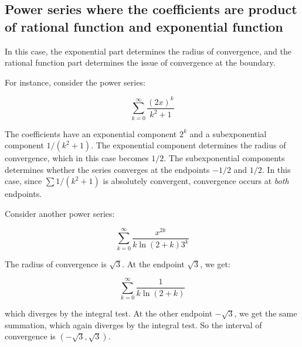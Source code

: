 \documentclass{amsart}
\begin{document}
\subsection{Power series where the coefficients are product of rational function and exponential function}

In this case, the exponential part determines the radius of
convergence, and the rational function part determines the issue of
convergence at the boundary.

For instance, consider the power series:

$$\sum_{k=0}^\infty \frac{(2x)^k}{k^2 + 1}$$

The coefficients have an exponential component $2^k$ and a
subexponential component $1/(k^2 + 1)$. The exponential component
determines the radius of convergence, which in this case becomes
$1/2$. The subexponential components determines whether the series
converges at the endpoints $-1/2$ and $1/2$. In this case, since $\sum
1/(k^2 + 1)$ is absolutely convergent, convergence occurs at {\em
both} endpoints.

Consider another power series:

$$\sum_{k=0}^\infty \frac{x^{2k}}{k\ln(2 + k)3^k}$$

The radius of convergence is $\sqrt{3}$. At the endpoint $\sqrt{3}$, we get:

$$\sum_{k=0}^\infty \frac{1}{k\ln(2 + k)}$$

which diverges by the integral test. At the other endpoint
$-\sqrt{3}$, we get the same summation, which again diverges by the
integral test. So the interval of convergence is
$(-\sqrt{3},\sqrt{3})$.
\end{document}
